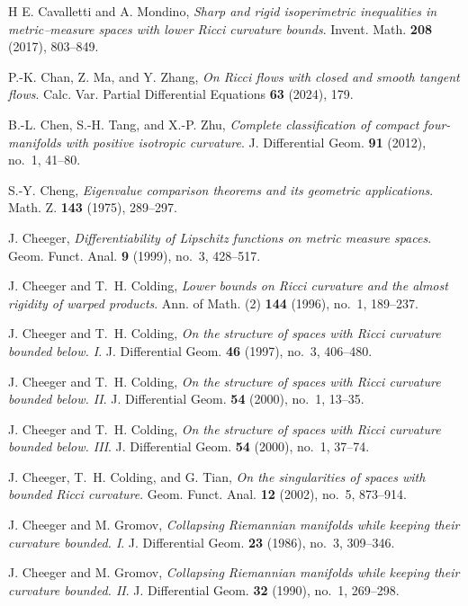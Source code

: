 \documentclass[11pt,reqno]{amsart}
\numberwithin{equation}{section}
\theoremstyle{definition}
\theoremstyle{remark}
\begin{document}
\begin{thebibliography}{H}
E. Cavalletti and A. Mondino,
\textit{Sharp and rigid isoperimetric inequalities in metric--measure spaces with lower Ricci curvature bounds}.
Invent. Math. \textbf{208} (2017), 803--849.

P.-K. Chan, Z. Ma, and Y. Zhang,
\textit{On Ricci flows with closed and smooth tangent flows}.
Calc. Var. Partial Differential Equations \textbf{63} (2024), 179.

B.-L. Chen, S.-H. Tang, and X.-P. Zhu,
\textit{Complete classification of compact four-manifolds with positive isotropic curvature}.
J. Differential Geom. \textbf{91} (2012), no.~1, 41--80.

S.-Y. Cheng,
\textit{Eigenvalue comparison theorems and its geometric applications}.
Math. Z. \textbf{143} (1975), 289--297.

J. Cheeger,
\textit{Differentiability of Lipschitz functions on metric measure spaces}.
Geom. Funct. Anal. \textbf{9} (1999), no.~3, 428--517.

J. Cheeger and T.~H. Colding,
\textit{Lower bounds on Ricci curvature and the almost rigidity of warped products}.
Ann. of Math. (2) \textbf{144} (1996), no.~1, 189--237.

J. Cheeger and T.~H. Colding,
{\textit{On the structure of spaces with Ricci curvature bounded below. I}}.
J. Differential Geom. \textbf{46} (1997), no.~3, 406--480.

J. Cheeger and T.~H. Colding,
\textit{On the structure of spaces with Ricci curvature bounded below. II}.
J. Differential Geom. \textbf{54} (2000), no.~1, 13--35.

J. Cheeger and T.~H. Colding,
\textit{On the structure of spaces with Ricci curvature bounded below. III}.
J. Differential Geom. \textbf{54} (2000), no.~1, 37--74.

J. Cheeger, T.~H. Colding, and G. Tian,
{\textit{On the singularities of spaces with bounded Ricci curvature}}.
Geom. Funct. Anal. \textbf{12} (2002), no.~5, 873--914.

J. Cheeger and M. Gromov,
{\textit{Collapsing Riemannian manifolds while keeping their curvature bounded. I}}.
J. Differential Geom. \textbf{23} (1986), no.~3, 309--346.

J. Cheeger and M. Gromov,
{\textit{Collapsing Riemannian manifolds while keeping their curvature bounded. II}}.
J. Differential Geom. \textbf{32} (1990), no.~1, 269--298.


\end{thebibliography}
\end{document}
